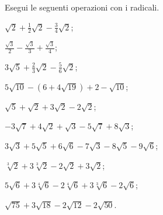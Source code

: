 \begin{esercizio}[\Ast]
 \label{ese:2.65}
Esegui le seguenti operazioni con i radicali.
 \begin{multicols}{2}
 \begin{enumeratea}
 \item $\sqrt 2+\frac 1 2\sqrt 2-\frac 3 4\sqrt 2$;
 \item $\frac{\sqrt 3} 2-\frac{\sqrt 3} 3+\frac{\sqrt 3} 4$;
 \item $3\sqrt 5+\frac 2 3\sqrt 2-\frac 5 6\sqrt 2$;
 \item $5\sqrt{10}-\left(6+4\sqrt{19}\right)+2-\sqrt{10}$;
 \item $\sqrt 5+\sqrt 2+3\sqrt 2-2\sqrt 2$;
 \item $-3\sqrt 7+4\sqrt 2+\sqrt 3-5\sqrt 7+8\sqrt 3$;
 \item $3\sqrt 3+5\sqrt 5+6\sqrt 6-7\sqrt 3-8\sqrt 5-9\sqrt 6$;
 \item $\sqrt[3]2+3\sqrt[3]2-2\sqrt 2+3\sqrt 2$;
 \item $5\sqrt 6+3\sqrt[4]6-2\sqrt[4]6+3\sqrt[3]6-2\sqrt 6$;
 \item $\sqrt{75}+3\sqrt{18}-2\sqrt{12}-2\sqrt{50}$.
 \end{enumeratea}
 \end{multicols}
\end{esercizio}

